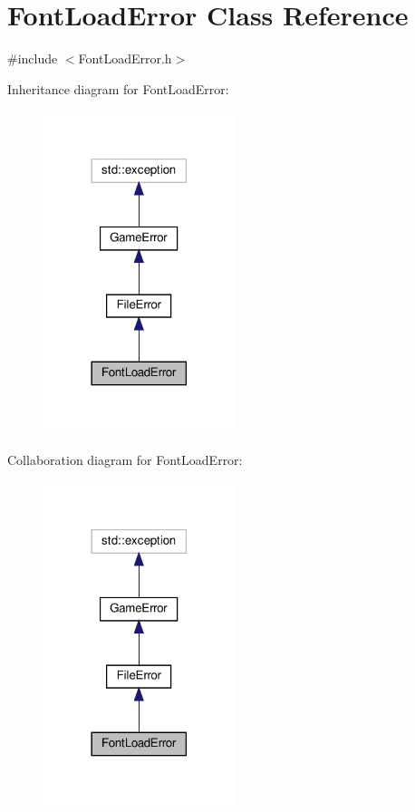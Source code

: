\hypertarget{classFontLoadError}{}\section{Font\+Load\+Error Class Reference}
\label{classFontLoadError}


{\ttfamily \#include $<$Font\+Load\+Error.\+h$>$}



Inheritance diagram for Font\+Load\+Error\+:\nopagebreak
\begin{figure}[H]
\begin{center}
\leavevmode
\includegraphics[width=158pt]{classFontLoadError__inherit__graph}
\end{center}
\end{figure}


Collaboration diagram for Font\+Load\+Error\+:\nopagebreak
\begin{figure}[H]
\begin{center}
\leavevmode
\includegraphics[width=158pt]{classFontLoadError__coll__graph}
\end{center}
\end{figure}
